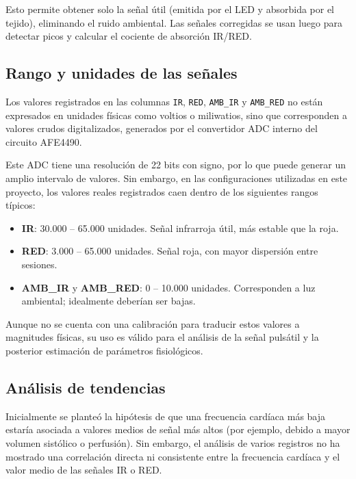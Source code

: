 Esto permite obtener solo la señal útil (emitida por el LED y absorbida por el tejido), eliminando el ruido ambiental. Las señales corregidas se usan luego para detectar picos y calcular el cociente de absorción IR/RED.

\subsection{Rango y unidades de las señales}

Los valores registrados en las columnas \texttt{IR}, \texttt{RED}, \texttt{AMB\_IR} y \texttt{AMB\_RED} no están expresados en unidades físicas como voltios o miliwatios, sino que corresponden a valores crudos digitalizados, generados por el convertidor ADC interno del circuito AFE4490.

Este ADC tiene una resolución de 22 bits con signo, por lo que puede generar un amplio intervalo de valores. Sin embargo, en las configuraciones utilizadas en este proyecto, los valores reales registrados caen dentro de los siguientes rangos típicos:

\begin{itemize}
    \item \textbf{IR}: 30.000 – 65.000 unidades. Señal infrarroja útil, más estable que la roja.
    \item \textbf{RED}: 3.000 – 65.000 unidades. Señal roja, con mayor dispersión entre sesiones.
    \item \textbf{AMB\_IR} y \textbf{AMB\_RED}: 0 – 10.000 unidades. Corresponden a luz ambiental; idealmente deberían ser bajas.
\end{itemize}

Aunque no se cuenta con una calibración para traducir estos valores a magnitudes físicas, su uso es  válido para el análisis de la señal pulsátil y la posterior estimación de parámetros fisiológicos.


\subsection{Análisis de tendencias}

Inicialmente se planteó la hipótesis de que una frecuencia cardíaca más baja estaría asociada a valores medios de señal más altos (por ejemplo, debido a mayor volumen sistólico o perfusión). Sin embargo, el análisis de varios registros no ha mostrado una correlación directa ni consistente entre la frecuencia cardíaca y el valor medio de las señales IR o RED.

